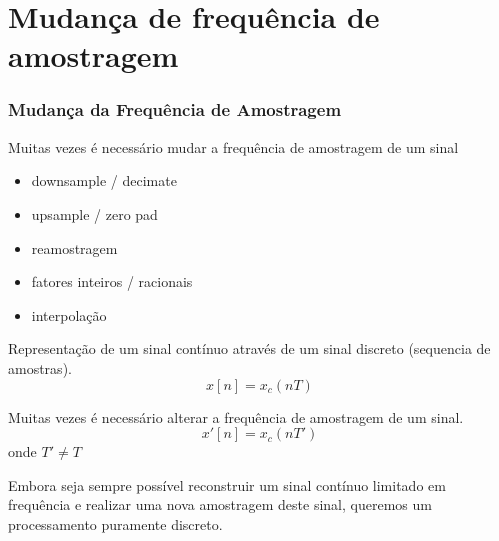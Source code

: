 \section{Mudança de frequência de amostragem}

\begin{frame}%
  \frametitle{Mudança da Frequência de Amostragem}
  Muitas vezes é necessário mudar a frequência de amostragem de um sinal
  \begin{itemize}
  \item downsample / decimate
  \item upsample / zero pad
  \item reamostragem
  \item fatores inteiros / racionais
  \item interpolação
  \end{itemize}

  Representação de um sinal contínuo através de um sinal discreto (sequencia de amostras).
  \begin{equation}
   x[n] = x_c (nT)
  \end{equation}

  Muitas vezes é necessário alterar a frequência de amostragem de um sinal.
  \begin{equation}
   x'[n] = x_c(nT')
  \end{equation}
  onde $T'\neq T$

  Embora seja sempre possível reconstruir um sinal contínuo limitado em frequência e
  realizar uma nova amostragem deste sinal, queremos um processamento puramente discreto.
\end{frame}


